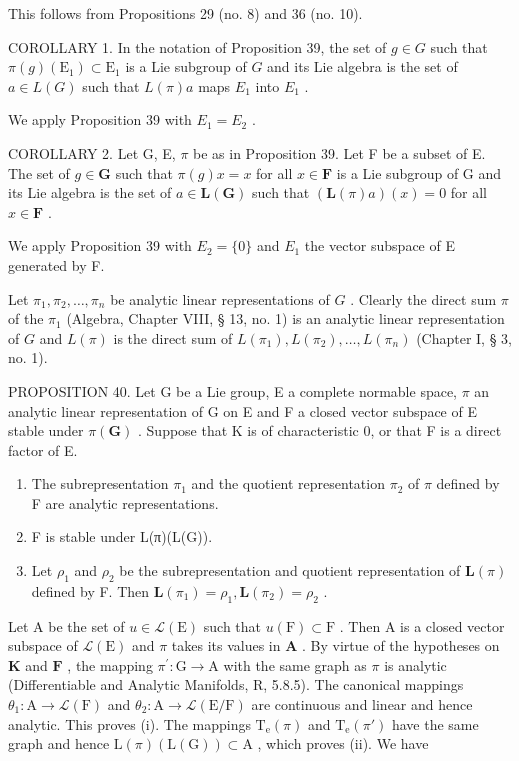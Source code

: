 This follows from Propositions 29 (no. 8) and 36 (no. 10).

COROLLARY 1. In the notation of Proposition 39, the set of \(g \in G\) such that \(\pi(g)(\mathrm{E}_1) \subset \mathrm{E}_1\) is a Lie subgroup of \(G\) and its Lie algebra is the set of \(a \in L(G)\) such that \(L(\pi)a\) maps \(E_1\) into \(E_1\) .

We apply Proposition 39 with \(E_{1} = E_{2}\) .

COROLLARY 2. Let G, E, \(\pi\) be as in Proposition 39. Let F be a subset of E. The set of \(g \in \mathbf{G}\) such that \(\pi(g)x = x\) for all \(x \in \mathbf{F}\) is a Lie subgroup of G and its Lie algebra is the set of \(a \in \mathbf{L}(\mathbf{G})\) such that \((\mathbf{L}(\pi)a)(x) = 0\) for all \(x \in \mathbf{F}\) .

We apply Proposition 39 with \(E_{2}=\{0\}\) and \(E_{1}\) the vector subspace of E generated by F.

Let \(\pi_1, \pi_2, \ldots, \pi_n\) be analytic linear representations of \(G\) . Clearly the direct sum \(\pi\) of the \(\pi_1\) (Algebra, Chapter VIII, § 13, no. 1) is an analytic linear representation of \(G\) and \(L(\pi)\) is the direct sum of \(L(\pi_1), L(\pi_2), \ldots, L(\pi_n)\) (Chapter I, § 3, no. 1).

PROPOSITION 40. Let G be a Lie group, E a complete normable space, \(\pi\) an analytic linear representation of G on E and F a closed vector subspace of E stable under \(\pi(\mathbf{G})\) . Suppose that K is of characteristic 0, or that F is a direct factor of E.

\begin{enumerate}
\def\labelenumi{(\roman{enumi})}
\item
  The subrepresentation \(\pi_1\) and the quotient representation \(\pi_2\) of \(\pi\) defined by F are analytic representations.
\item
  F is stable under L(π)(L(G)).
\item
  Let \(\rho_{1}\) and \(\rho_{2}\) be the subrepresentation and quotient representation of \(\mathbf{L}(\pi)\) defined by F. Then \(\mathbf{L}(\pi_1) = \rho_1, \mathbf{L}(\pi_2) = \rho_2\) .
\end{enumerate}

Let \(\mathrm{A}\) be the set of \(u\in \mathcal{L}(\mathrm{E})\) such that \(u(\mathrm{F})\subset \mathrm{F}\) . Then \(\mathrm{A}\) is a closed vector subspace of \(\mathcal{L}(\mathrm{E})\) and \(\pi\) takes its values in \(\mathbf{A}\) . By virtue of the hypotheses on \(\mathbf{K}\) and \(\mathbf{F}\) , the mapping \(\pi^{\prime}\colon \mathrm{G}\to \mathrm{A}\) with the same graph as \(\pi\) is analytic (Differentiable and Analytic Manifolds, R, 5.8.5). The canonical mappings \(\theta_{1}\colon \mathrm{A}\to \mathcal{L}(\mathrm{F})\) and \(\theta_{2}\colon \mathrm{A}\to \mathcal{L}(\mathrm{E / F})\) are continuous and linear and hence analytic. This proves (i). The mappings \(\mathrm{T_e}(\pi)\) and \(\mathrm{T_e}(\pi ')\) have the same graph and hence \(\mathrm{L}(\pi)(\mathrm{L}(\mathrm{G}))\subset \mathrm{A}\) , which proves (ii). We have

